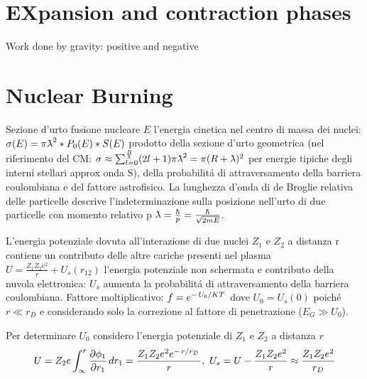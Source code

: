 \section{EXpansion and contraction phases}

\begin{frame}{Work done by gravity: positive and negative}

\end{frame}


\section{Nuclear Burning}

\begin{frame}{Sezione d'urto fusione nucleare}
$E$ l'energia cinetica nel centro di massa dei nuclei: $\sigma(E)=\pi\lambdabar^2*P_0(E)*S(E)$
prodotto della sezione d'urto geometrica (nel riferimento del CM: $\sigma\approx\sum_{l=0}^{\frac{R}{\lambdabar}}(2l+1)\pi\lambdabar^2=\pi(R+\lambdabar)^2$
per energie tipiche degli interni stellari approx onda S), della probabilit\'a di attraversamento della barriera coulombiana e del fattore astrofisico. La lunghezza d'onda di de Broglie relativa delle particelle descrive l'indeterminazione sulla posizione nell'urto di due particelle con momento relativo p $\lambdabar=\frac{\hbar}{p}=\frac{\hbar}{\sqrt{2mE}}$.

L'energia potenziale dovuta all'interazione di due nuclei $Z_1$ e $Z_2$ a distanza r contiene un contributo delle altre cariche presenti nel plasma $U=\frac{Z_1Z_2e^2}{r}+U_s(r_{12})$
l'energia potenziale non schermata e contributo della nuvola elettronica: $U_s$ aumenta la probabilit\'a di attraversamento della barriera coulombiana. Fattore moltiplicativo: $f=e^{-\left.{U_0}\middle/{KT}\right.}$ dove $U_0=U_s(0)$ poich\'e $r\ll r_D$ e considerando solo la correzione al fattore di penetrazione ($E_G\gg U_0$).

Per determinare $U_0$ considero l'energia potenziale di $Z_1$ e $Z_2$ a distanza $r$
\begin{equation*}
U=Z_2e\int_{\infty}^r\PDy{r_1}{\phi_1}\,dr_1=\frac{Z_1Z_2e^2\exp{-\midfrac{r}{r_D}}}{r},\ U_s=U-\frac{Z_1Z_2e^2}{r}\approx\frac{Z_1Z_2e^2}{r_D}
\end{equation*}
\end{frame}

